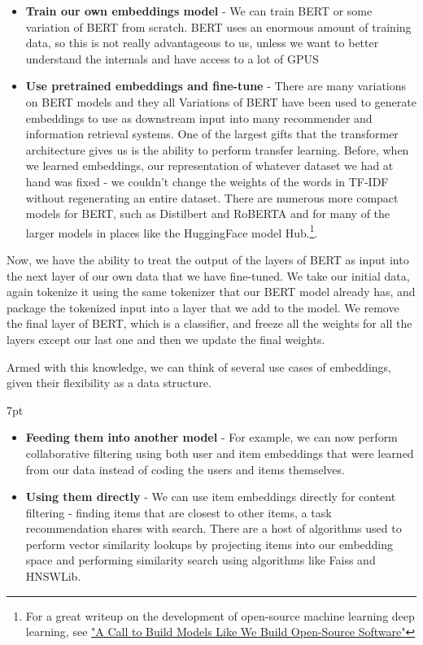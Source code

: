 \documentclass[11pt, table]{diazessay} %
\newenvironment{formal}{%
  \def\FrameCommand{%
	\hspace{1pt}%
	{\color{w_lightblue}\vrule width 2pt}%
	{\color{formalshade}\vrule width 4pt}%
	\colorbox{formalshade}%
  }%
  \MakeFramed{\advance\hsize-\width\FrameRestore}%
  \noindent\hspace{-4.55pt}%
  \begin{adjustwidth}{}{7pt}%
  \vspace{2pt}\vspace{2pt}%
}
{%
  \vspace{2pt}\end{adjustwidth}\endMakeFramed%
}
\begin{document}
\begin{sloppypar}
\begin{itemize}
\item \textbf{Train our own embeddings model} - We can train BERT or some variation of BERT from scratch. BERT uses an enormous amount of training data, so this is not really advantageous to us, unless we want to better understand the internals and have access to a lot of GPUS
\item \textbf{Use pretrained embeddings and fine-tune } - There are many variations on BERT models and they all Variations of BERT have been used to generate embeddings to use as downstream input into many recommender and information retrieval systems.  One of the largest gifts that the transformer architecture gives us is the ability to perform transfer learning. Before, when we learned embeddings, our representation of whatever dataset we had at hand was fixed - we couldn't change the weights of the words in TF-IDF without regenerating an entire dataset. There are numerous more compact models for BERT, such as Distilbert and RoBERTA and for many of the larger models in places like the HuggingFace model Hub.\footnote{For a great writeup on the development of open-source machine learning deep learning, see  \href{https://colinraffel.com/blog/a-call-to-build-models-like-we-build-open-source-software.html}{"A Call to Build Models Like We Build Open-Source Software"}}.  
\end{itemize}

Now, we have the ability to treat the output of the layers of BERT as input into the next layer of our own data that we have fine-tuned. We take our initial data, again tokenize it using the same tokenizer that our BERT model already has, and package the tokenized input into a layer that we add to the model. We remove the final layer of BERT, which is a classifier, and freeze all the weights for all the layers except our last one and then we update the final weights.

Armed with this knowledge, we can think of several use cases of embeddings, given their flexibility as a data structure. 

\begin{formal}
\begin{itemize}
\item\textbf{Feeding them into another model} - For example, we can now perform collaborative filtering using both user and item embeddings that were learned from our data instead of coding the users and items themselves.
\item\textbf{Using them directly} - We can use item embeddings directly for content filtering - finding items that are closest to other items, a task recommendation shares with search. There are a host of algorithms used to perform vector similarity lookups by projecting items into our embedding space and performing similarity search using algorithms like Faiss and HNSWLib.   
\end{itemize}
\end{formal}


\end{sloppypar}
\end{document}
